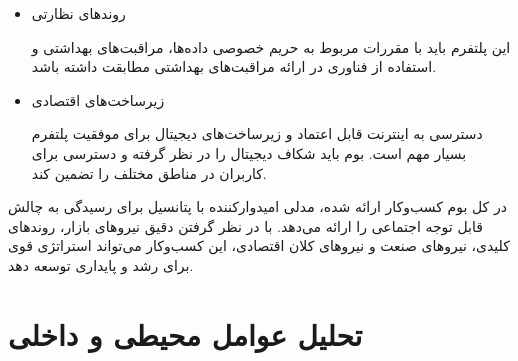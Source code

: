 \documentclass[dvipsnames, svgnames, x11names, 11pt]{article}
\begin{document}
\begin{enumerate}
\begin{itemize}
\item
روندهای نظارتی

این پلتفرم باید با مقررات مربوط به حریم خصوصی داده‌ها، مراقبت‌های بهداشتی و استفاده از فناوری در ارائه مراقبت‌های بهداشتی مطابقت داشته باشد.

\item
زیرساخت‌های اقتصادی

دسترسی به اینترنت قابل اعتماد و زیرساخت‌های دیجیتال برای موفقیت پلتفرم بسیار مهم است. بوم باید شکاف دیجیتال را در نظر گرفته و دسترسی برای کاربران در مناطق مختلف را تضمین کند.
\end{itemize}
\end{enumerate}
در کل بوم کسب‌وکار ارائه شده، مدلی امیدوارکننده با پتانسیل برای رسیدگی به چالش قابل توجه اجتماعی را ارائه می‌دهد. با در نظر گرفتن دقیق نیروهای بازار، روندهای کلیدی، نیروهای صنعت و نیروهای کلان اقتصادی، این کسب‌وکار می‌تواند استراتژی قوی برای رشد و پایداری توسعه دهد.

\newpage
\section{تحلیل عوامل محیطی و داخلی}
\end{document}
